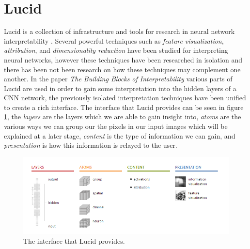 \section{Lucid}
Lucid is a collection of infrastructure and tools for research in neural network interpretability \cite{Https://github.com/tensorflow/lucid}. Several powerful techniques such as \emph{feature visualization}, \emph{attribution}, and \emph{dimensionality reduction} have been studied for interpreting neural networks, however these techniques have been researched in isolation and there has been not been research on how these techniques may complement one another. In the paper \emph{The Building Blocks of Interpretability} \cite{olah2018the} various parts of Lucid are used in order to gain some interpretation into the hidden layers of a CNN network, the previously isolated interpretation techniques have been unified to create a rich interface. The interface that Lucid provides can be seen in figure \ref{fig:lucid-summary}, the \emph{layers} are the layers which we are able to gain insight into, \emph{atoms} are the various ways we can group our the pixels in our input images which will be explained at a later stage, \emph{content} is the type of information we can gain, and \emph{presentation} is how this information is relayed to the user.
\cite{olah2018the}

\begin  {figure}[!htpb]
  \includegraphics[width=\linewidth]{Evaluation_Images/LUCID_SUM.png}
  \caption{The interface that Lucid provides. \cite{olah2018the}}
  \label{fig:lucid-summary}
\end{figure}



